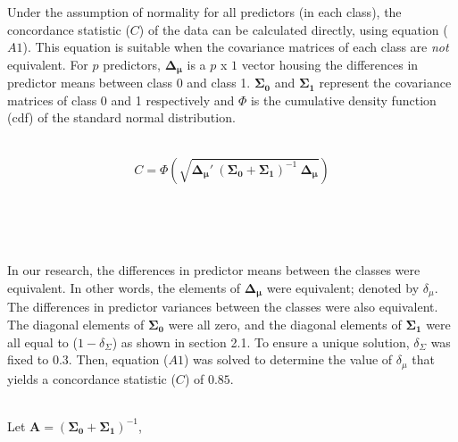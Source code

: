 \documentclass[AMA,STIX1COL,]{WileyNJD-v2}
\begin{document}
\hfill\break
Under the assumption of normality for all predictors (in each class),
the concordance statistic (\(C\)) of the data can be calculated
directly, using equation (\(A1\)). This equation is suitable when the
covariance matrices of each class are \emph{not} equivalent. For \(p\)
predictors, \(\pmb{\Delta_\mu}\) is a \(p\) x \(1\) vector housing the
differences in predictor means between class 0 and class 1.
\(\pmb{\Sigma_0}\) and \(\pmb{\Sigma_1}\) represent the covariance
matrices of class 0 and 1 respectively and \(\Phi\) is the cumulative
density function (cdf) of the standard normal distribution.\\
\strut \\
\begin{equation} \tag{A1}
C = \Phi \left( \sqrt{\pmb{\Delta_\mu}{'}\  (\pmb{\Sigma_0} + \pmb{\Sigma_1})^{-1} \ \pmb{\Delta_{\mu}}} \right)
\end{equation}\\
\strut \\
\strut \\
In our research, the differences in predictor means between the classes
were equivalent. In other words, the elements of \(\pmb{\Delta_\mu}\)
were equivalent; denoted by \(\delta_\mu\). The differences in predictor
variances between the classes were also equivalent. The diagonal
elements of \(\pmb{\Sigma_0}\) were all zero, and the diagonal elements
of \(\pmb{\Sigma_1}\) were all equal to (\(1- \delta_\Sigma\)) as shown
in section 2.1. To ensure a unique solution, \(\delta_\Sigma\) was fixed
to \(0.3\). Then, equation (\(A1\)) was solved to determine the value of
\(\delta_\mu\) that yields a concordance statistic (\(C\)) of
\(0.85\).\\
\strut \\
Let \(\pmb{A} = (\pmb{\Sigma_0} + \pmb{\Sigma_1})^{-1}\),
\end{document}
